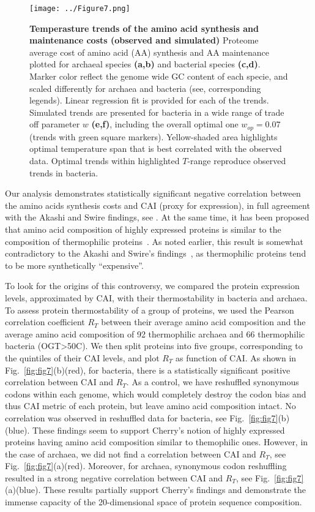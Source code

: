 \documentclass[10pt,letterpaper]{article}
\begin{document}
\begin{figure}[h!]
\texttt{[image: ../Figure7.png]}
\caption{
{\bf Temperasture trends of the amino acid synthesis and maintenance costs (observed and simulated)}
Proteome average cost of amino acid (AA) synthesis and AA maintenance plotted for archaeal species {\bf (a,b)} and bacterial species {\bf (c,d)}. Marker color reflect the genome wide GC content of each specie, and scaled differently for archaea and bacteria (see, corresponding legends). Linear regression fit is provided for each of the trends.
Simulated trends are presented for bacteria in a wide range of trade off parameter $w$ {\bf (e,f)}, including the overall optimal one $w_{op}=0.07$ (trends with green square markers). Yellow-shaded area highlights optimal temperature span that is best correlated with the observed data. Optimal trends within highlighted $T$-range reproduce observed trends in bacteria.
}
\label{fig:fig6}
\end{figure}


Our analysis demonstrates statistically significant negative correlation between the amino acids synthesis costs and CAI (proxy for expression), in full agreement with the Akashi and Swire findings, see . At the same time, it has been proposed that amino acid composition of highly expressed proteins is similar to the composition of thermophilic proteins~\cite{Cherry2010Highly}. As noted earlier, this result is somewhat contradictory to the Akashi and Swire's findings~\cite{Serohijos2012Protein}, as thermophilic proteins tend to be more synthetically ``expensive''.


To look for the origins of this controversy, we compared the protein expression levels, approximated by CAI, with their thermostability in bacteria and archaea. To assess protein thermostability of a group of proteins, we used the Pearson correlation coefficient $R_T$ between their average amino acid composition and the average amino acid composition of 92 thermophilic archaea and 66 thermophilic bacteria (OGT>50\textdegree C).  We then split proteins into five groups, corresponding to the quintiles of their CAI levels, and plot $R_T$ as function of CAI. As shown in Fig.~\ref{fig:fig7}(b)(red), for bacteria, there is a statistically significant positive correlation between CAI and $R_T$. As a control, we have reshuffled synonymous codons within each genome, which would completely destroy the codon bias and thus CAI metric of each protein, but leave amino acid composition intact. No correlation was observed in reshuffled data for bacteria, see Fig.~\ref{fig:fig7}(b)(blue). These findings seem to support Cherry's notion of highly expressed proteins having amino acid composition similar to themophilic ones. However, in the case of archaea, we did not find a correlation between CAI and $R_T$, see Fig.~\ref{fig:fig7}(a)(red). Moreover, for archaea, synonymous codon reshuffling resulted in a strong negative correlation between CAI and $R_T$, see Fig.~\ref{fig:fig7}(a)(blue). These results partially support Cherry's findings and demonstrate the immense capacity of the 20-dimensional space of protein sequence composition. 
\end{document}
